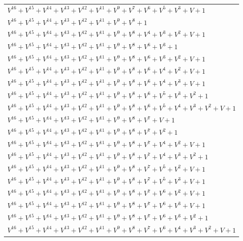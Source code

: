\documentclass[12pt]{article}
\begin{document}
\begin{adjustwidth}{-4cm}{}
\begin{center}
\begin{longtable}{|l|}
$V^{16}  +V^{15}  +V^{14}  +V^{13}  +V^{12}  +V^{11}  +V^{9}  +V^{7}  +V^{6}  +V^{5}  +V^{3}  + V + 1$ \\
$V^{16}  +V^{15}  +V^{14}  +V^{13}  +V^{12}  +V^{11}  +V^{9}  +V^{8}  + 1$ \\
$V^{16}  +V^{15}  +V^{14}  +V^{13}  +V^{12}  +V^{11}  +V^{9}  +V^{8}  +V^{4}  +V^{3}  +V^{2}  + V + 1$ \\
$V^{16}  +V^{15}  +V^{14}  +V^{13}  +V^{12}  +V^{11}  +V^{9}  +V^{8}  +V^{6}  +V^{3}  + 1$ \\
$V^{16}  +V^{15}  +V^{14}  +V^{13}  +V^{12}  +V^{11}  +V^{9}  +V^{8}  +V^{6}  +V^{3}  +V^{2}  + V + 1$ \\
$V^{16}  +V^{15}  +V^{14}  +V^{13}  +V^{12}  +V^{11}  +V^{9}  +V^{8}  +V^{6}  +V^{4}  +V^{2}  + V + 1$ \\
$V^{16}  +V^{15}  +V^{14}  +V^{13}  +V^{12}  +V^{11}  +V^{9}  +V^{8}  +V^{6}  +V^{4}  +V^{3}  + V + 1$ \\
$V^{16}  +V^{15}  +V^{14}  +V^{13}  +V^{12}  +V^{11}  +V^{9}  +V^{8}  +V^{6}  +V^{5}  +V^{3}  +V^{2}  + 1$ \\
$V^{16}  +V^{15}  +V^{14}  +V^{13}  +V^{12}  +V^{11}  +V^{9}  +V^{8}  +V^{6}  +V^{5}  +V^{4}  +V^{3}  +V^{2}  + V + 1$ \\
$V^{16}  +V^{15}  +V^{14}  +V^{13}  +V^{12}  +V^{11}  +V^{9}  +V^{8}  +V^{7}  + V + 1$ \\
$V^{16}  +V^{15}  +V^{14}  +V^{13}  +V^{12}  +V^{11}  +V^{9}  +V^{8}  +V^{7}  +V^{2}  + 1$ \\
$V^{16}  +V^{15}  +V^{14}  +V^{13}  +V^{12}  +V^{11}  +V^{9}  +V^{8}  +V^{7}  +V^{4}  +V^{2}  + V + 1$ \\
$V^{16}  +V^{15}  +V^{14}  +V^{13}  +V^{12}  +V^{11}  +V^{9}  +V^{8}  +V^{7}  +V^{4}  +V^{3}  +V^{2}  + 1$ \\
$V^{16}  +V^{15}  +V^{14}  +V^{13}  +V^{12}  +V^{11}  +V^{9}  +V^{8}  +V^{7}  +V^{5}  +V^{2}  + V + 1$ \\
$V^{16}  +V^{15}  +V^{14}  +V^{13}  +V^{12}  +V^{11}  +V^{9}  +V^{8}  +V^{7}  +V^{5}  +V^{3}  + V + 1$ \\
$V^{16}  +V^{15}  +V^{14}  +V^{13}  +V^{12}  +V^{11}  +V^{9}  +V^{8}  +V^{7}  +V^{6}  +V^{2}  + V + 1$ \\
$V^{16}  +V^{15}  +V^{14}  +V^{13}  +V^{12}  +V^{11}  +V^{9}  +V^{8}  +V^{7}  +V^{6}  +V^{3}  + V + 1$ \\
$V^{16}  +V^{15}  +V^{14}  +V^{13}  +V^{12}  +V^{11}  +V^{9}  +V^{8}  +V^{7}  +V^{6}  +V^{3}  +V^{2}  + 1$ \\
$V^{16}  +V^{15}  +V^{14}  +V^{13}  +V^{12}  +V^{11}  +V^{9}  +V^{8}  +V^{7}  +V^{6}  +V^{4}  +V^{3}  +V^{2}  + V + 1$ \\

\end{longtable}
\end{center}
\end{adjustwidth}
\end{document}
